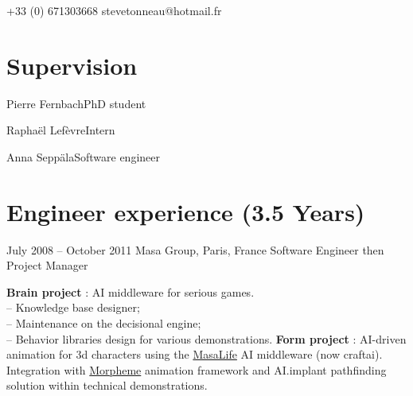 \documentclass{tccv}
\begin{document}
\begin{eventlist}

\end{eventlist}

    {+33 (0) 671303668}
    {stevetonneau@hotmail.fr}


\section{Supervision}

\begin{factlist}
\item{Pierre Fernbach}{PhD student}
\item{Rapha\"el Lef\`evre}{Intern}
\item{Anna Sepp\"ala}{Software engineer}
\end{factlist}


\section{Engineer experience (3.5 Years)}

\begin{eventlist}

\item{July 2008 -- October 2011}
     {Masa Group, Paris, France}
     {Software Engineer then Project Manager}

\textbf{Brain project} : AI middleware for serious games.
\\ -- Knowledge base designer;
\\ -- Maintenance on the decisional engine;
\\ -- Behavior libraries design for various demonstrations.
\textbf{Form project} : AI-driven animation for 3d characters using the \href{http://www.craft.ai/}{MasaLife} AI middleware (now craftai).
Integration with \href{http://www.naturalmotion.com/products/morpheme/}{Morpheme} animation framework and
AI.implant pathfinding
solution within technical demonstrations.



\end{eventlist}
\end{document}
